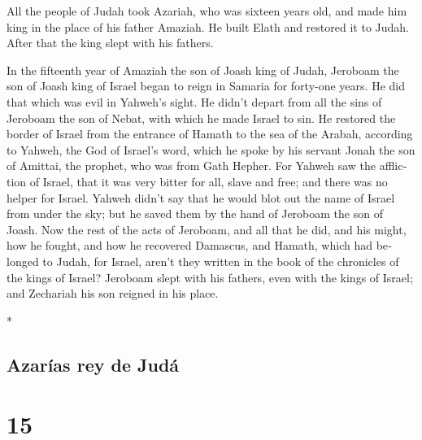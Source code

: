 \begin{paracol}{2}
\begin{otherlanguage}{english}
 All the people of Judah took Azariah, who was sixteen
years old, and made him king in the place of his father Amaziah.
 He built Elath and restored it to Judah. After that the
king slept with his fathers.

 In the fifteenth year of Amaziah the son of Joash king
of Judah, Jeroboam the son of Joash king of Israel began to reign in
Samaria for forty-one years.  He did that which was evil
in Yahweh's sight. He didn't depart from all the sins of Jeroboam the
son of Nebat, with which he made Israel to sin.  He
restored the border of Israel from the entrance of Hamath to the sea of
the Arabah, according to Yahweh, the God of Israel's word, which he
spoke by his servant Jonah the son of Amittai, the prophet, who was from
Gath Hepher.  For Yahweh saw the affliction of Israel,
that it was very bitter for all, slave and free; and there was no helper
for Israel.  Yahweh didn't say that he would blot out the
name of Israel from under the sky; but he saved them by the hand of
Jeroboam the son of Joash.  Now the rest of the acts of
Jeroboam, and all that he did, and his might, how he fought, and how he
recovered Damascus, and Hamath, which had belonged to Judah, for Israel,
aren't they written in the book of the chronicles of the kings of
Israel?  Jeroboam slept with his fathers, even with the
kings of Israel; and Zechariah his son reigned in his place.

\end{otherlanguage}

\switchcolumn[0]*

\hypertarget{azaruxedas-rey-de-juduxe1}{%
\subsection{Azarías rey de Judá}\label{azaruxedas-rey-de-juduxe1}}

\hypertarget{section-28}{%
\section{15}\label{section-28}}


\end{paracol}
